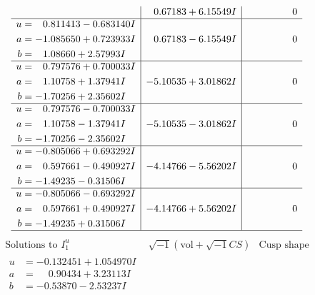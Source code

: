 \documentclass[1p]{elsarticle_modified}
\theoremstyle{definition}
\newcommand{\I}{\sqrt{-1}}
\begin{document}
$$\begin{array}{c|c|c}
 & \phantom{-}0.67183 + 6.15549 I & \phantom{-0.000000 } 0 \\ \hline\begin{aligned}
u &= \phantom{-}0.811413 - 0.683140 I \\
a &= -1.085650 + 0.723933 I \\
b &= \phantom{-}1.08660 + 2.57993 I\end{aligned}
 & \phantom{-}0.67183 - 6.15549 I & \phantom{-0.000000 } 0 \\ \hline\begin{aligned}
u &= \phantom{-}0.797576 + 0.700033 I \\
a &= \phantom{-}1.10758 + 1.37941 I \\
b &= -1.70256 + 2.35602 I\end{aligned}
 & -5.10535 + 3.01862 I & \phantom{-0.000000 } 0 \\ \hline\begin{aligned}
u &= \phantom{-}0.797576 - 0.700033 I \\
a &= \phantom{-}1.10758 - 1.37941 I \\
b &= -1.70256 - 2.35602 I\end{aligned}
 & -5.10535 - 3.01862 I & \phantom{-0.000000 } 0 \\ \hline\begin{aligned}
u &= -0.805066 + 0.693292 I \\
a &= \phantom{-}0.597661 - 0.490927 I \\
b &= -1.49235 - 0.31506 I\end{aligned}
 & -4.14766 - 5.56202 I & \phantom{-0.000000 } 0 \\ \hline\begin{aligned}
u &= -0.805066 - 0.693292 I \\
a &= \phantom{-}0.597661 + 0.490927 I \\
b &= -1.49235 + 0.31506 I\end{aligned}
 & -4.14766 + 5.56202 I & \phantom{-0.000000 } 0\\
 \hline 
 \end{array}$$\newpage$$\begin{array}{c|c|c}  
\text{Solutions to }I^u_{1}& \I (\text{vol} + \sqrt{-1}CS) & \text{Cusp shape}\\
 \hline 
\begin{aligned}
u &= -0.132451 + 1.054970 I \\
a &= \phantom{-}0.90434 + 3.23113 I \\
b &= -0.53870 - 2.53237 I\end{aligned}

\end{array}$$
\end{document}
